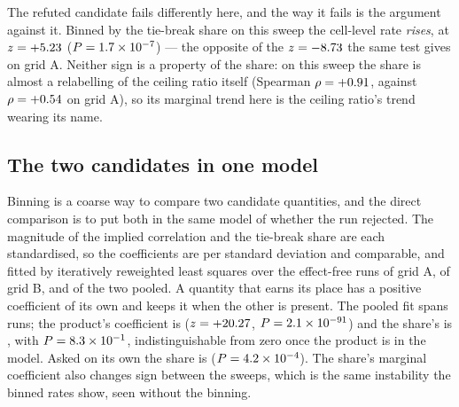 \documentclass[11pt]{article}
\begin{document}
The refuted candidate fails differently here, and the way it fails is the
argument against it. Binned by the tie-break share on this sweep the cell-level
rate \emph{rises}, at $z=+5.23$ ($P=1.7\times10^{-7}$) --- the
opposite of the $z=-8.73$ the same test gives on grid A. Neither
sign is a property of the share: on this sweep the share is almost a relabelling
of the ceiling ratio itself (Spearman $\rho=+0.91$, against
$\rho=+0.54$ on grid A), so its marginal trend here is the ceiling
ratio's trend wearing its name.

\subsection{The two candidates in one model}
Binning is a coarse way to compare two candidate quantities, and the direct
comparison is to put both in the same model of whether the run rejected. The
magnitude of the implied correlation and the tie-break share are each
standardised, so the coefficients are per standard deviation and comparable, and
fitted by iteratively reweighted least squares over the effect-free runs of grid
A, of grid B, and of the two pooled. A quantity that earns its place has a
positive coefficient of its own and keeps it when the other is present. The
pooled fit spans \jointN{} runs; the product's coefficient is \jointProductCoef{}
($z=+20.27$, $P=2.1\times10^{-91}$) and the share's is \jointShareCoef{},
with $P=8.3\times10^{-1}$, indistinguishable from zero once the product is in the
model. Asked on its own the share is \jointShareAloneCoef{}
($P=4.2\times10^{-4}$). The share's marginal coefficient also changes sign
between the sweeps, which is the same instability the binned rates show, seen
without the binning.
\end{document}
